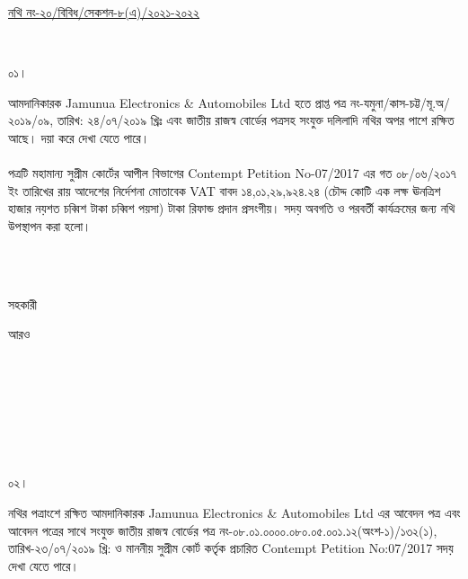 \documentclass[12pt]{article}
\newcommand{\fileno}{নথি নং-২০/বিবিধ/সেকশন-৮(এ)/২০২১-২০২২}
\newcommand{\nbrl}{নং-০৮.০১.০০০০.০৮০.০৫.০০১.১২(অংশ-১)/১৩২(১), তারিখ-২৩/০৭/২০১৯ খ্রি:}
\newcommand{\tvat}{১৪,০১,২৯,৯২৪.২৪ (চৌদ্দ কোটি এক লক্ষ ঊনত্রিশ হাজার নয়শত চব্বিশ টাকা চব্বিশ পয়সা) টাকা}
\begin{document}
\begin{minipage}[t]{0.59\linewidth}
\hspace{0.5em}
\end{minipage}
\begin{minipage}[t]{1\textwidth}
\underline{{\fileno}}
\end{minipage}
\\
\begin{minipage}[t]{0.05\linewidth}
০১।
\end{minipage}
\begin{minipage}[t]{1\linewidth}
আমদানিকারক
Jamunua Electronics \& Automobiles Ltd
হতে প্রাপ্ত
পত্র নং-যমুনা/কাস-চট্ট/মূ.অ/২০১৯/০৯,
তারিখ: ২৪/০৭/২০১৯ খ্রিঃ
এবং জাতীয় রাজস্ব বোর্ডের পত্রসহ সংযুক্ত
দলিলাদি নথির অপর পাশে রক্ষিত আছে।
দয়া করে দেখা যেতে পারে।
\\
\\
পত্রটি মহামান্য সুপ্রীম কোর্টের আপীল বিভাগের
Contempt Petition No-07/2017
এর গত ০৮/০৬/২০১৭ ইং তারিখের
রায় আদেশের নির্দেশনা মোতাবেক
VAT বাবদ
{\tvat} রিফান্ড প্রদান প্রসংগীয়।
সদয় অবগতি ও পরবর্তী কার্যক্রমের জন্য
নথি উপস্থাপন করা হলো।
\end{minipage}
\\
\\
\begin{minipage}[t]{0.05\linewidth}
\hspace{1em}
\end{minipage}
\begin{minipage}[t]{.5\linewidth}
সহকারী
\end{minipage}
\begin{minipage}[t]{1\linewidth}
আরও
\end{minipage}
\\
\\
\\
\\
\\
\\
\begin{minipage}[t]{0.05\linewidth}
০২।
\end{minipage}
\begin{minipage}[t]{1\linewidth}
নথির পত্রাংশে রক্ষিত আমদানিকারক
Jamunua Electronics \& Automobiles Ltd
এর আবেদন পত্র এবং আবেদন পত্রের সাথে সংযুক্ত
জাতীয় রাজস্ব বোর্ডের পত্র
{\nbrl} ও মাননীয় সুপ্রীম কোর্ট কর্তৃক প্রচারিত
Contempt Petition No:07/2017
সদয় দেখা যেতে পারে।
\end{minipage}
\\
\\
\\
\end{document}
